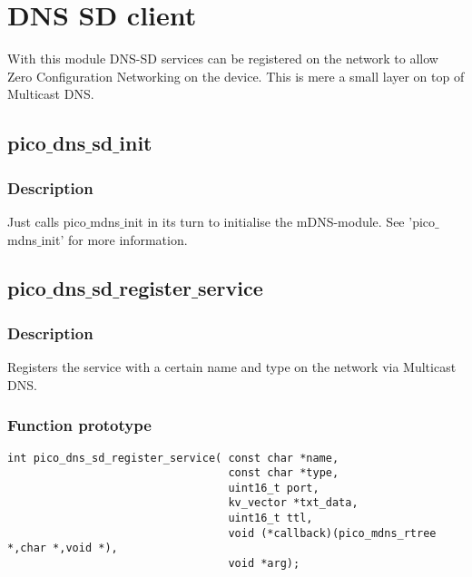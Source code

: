 \section{DNS SD client}

With this module DNS-SD services can be registered on the network to allow Zero Configuration Networking on the device. This is mere a small layer on top of Multicast DNS.

\subsection{pico$\_$dns$\_$sd$\_$init}

\subsubsection*{Description}
Just calls pico$\_$mdns$\_$init in its turn to initialise the mDNS-module. See 'pico$\_$mdns$\_$init' for more information.


\subsection{pico$\_$dns$\_$sd$\_$register$\_$service}

\subsubsection*{Description}
Registers the service with a certain name and type on the network via Multicast DNS.
\subsubsection*{Function prototype}
\begin{verbatim}
int pico_dns_sd_register_service( const char *name,
                                  const char *type,
                                  uint16_t port,
                                  kv_vector *txt_data,
                                  uint16_t ttl,
                                  void (*callback)(pico_mdns_rtree *,char *,void *),
                                  void *arg);
\end{verbatim}

